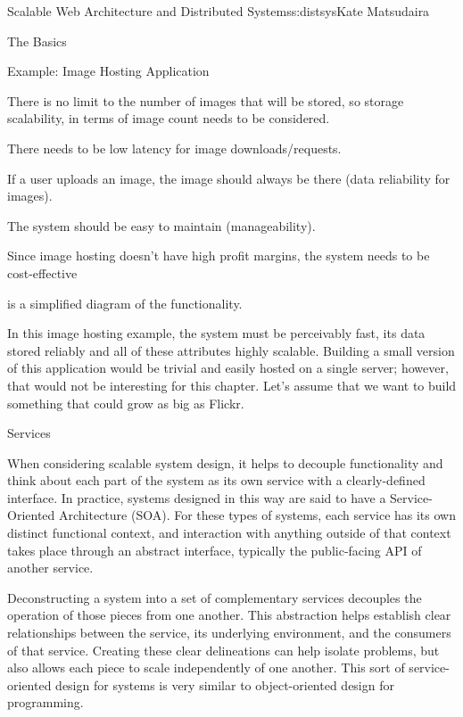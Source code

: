 \begin{aosachapter}{Scalable Web Architecture and Distributed Systems}{s:distsys}{Kate Matsudaira}
\begin{aosasect1}{The Basics}
\begin{aosasect2}{Example: Image Hosting Application}
\begin{aosaitemize}

\item There is no limit to the number of images that will be
  stored, so storage scalability, in terms of image count needs to be
  considered.

\item There needs to be low latency for image downloads/requests.

\item If a user uploads an image, the image should always be there
  (data reliability for images).

\item The system should be easy to maintain (manageability).

\item Since image hosting doesn't have high profit margins, the system
  needs to be cost-effective

\end{aosaitemize}

 is a simplified diagram of the functionality.


In this image hosting example, the system must be perceivably fast,
its data stored reliably and all of these attributes highly
scalable. Building a small version of this application would be
trivial and easily hosted on a single server; however, that would not be
interesting for this chapter. Let's assume that we want to build
something that could grow as big as Flickr.

\end{aosasect2}

\begin{aosasect2}{Services}

When considering scalable system design, it helps to decouple
functionality and think about each part of the system as its own
service with a clearly-defined interface. In practice, systems
designed in this way are said to have a Service-Oriented Architecture
(SOA). For these types of systems, each service has its own distinct
functional context, and interaction with anything outside of that
context takes place through an abstract interface, typically the
public-facing API of another service.

Deconstructing a system into a set of complementary services decouples
the operation of those pieces from one another. This abstraction helps
establish clear relationships between the service, its underlying
environment, and the consumers of that service. Creating these
clear delineations can help isolate problems, but also allows each
piece to scale independently of one another. This sort of
service-oriented design for systems is very similar to object-oriented
design for programming.


\end{aosasect2}
\end{aosasect1}
\end{aosachapter}
